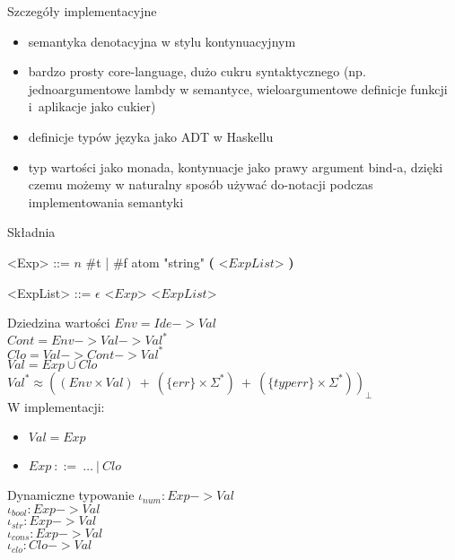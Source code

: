 \documentclass[12pt,serif]{beamer}
\begin{document}
\begin{frame}{Szczegóły implementacyjne}
\begin{itemize}
  \item semantyka denotacyjna w stylu kontynuacyjnym
  \item bardzo prosty core-language, dużo cukru syntaktycznego
        (np. jednoargumentowe lambdy w semantyce,
        wieloargumentowe definicje funkcji i~aplikacje jako cukier)
  \item definicje typów języka jako ADT w Haskellu
  \item typ wartości jako monada, kontynuacje jako prawy argument bind-a,
        dzięki czemu możemy w naturalny sposób używać do-notacji podczas
        implementowania semantyki
\end{itemize}
\end{frame}

\begin{frame}{Składnia}
\setlength{\grammarindent}{8em}
\begin{grammar}
<Exp> ::= $n$
\alt \#t | \#f
\alt atom
\alt "string"
\alt \textbf{(} <$ExpList$> \textbf{)}

<ExpList> ::= $\epsilon$
\alt <$Exp$> <$ExpList$>
\end{grammar}
\end{frame}

\begin{frame}{Dziedzina wartości}
$Env = Ide -> Val$ \\
$Cont = Env -> Val -> Val^{*}$ \\
$Clo = Val -> Cont -> Val^{*}$ \\
$Val = Exp \cup Clo$ \\
$Val^{*} \approx ((Env \times Val)~+~(\{err\} \times \Sigma^{*})~+~(\{typerr\} \times \Sigma^{*}))_{\bot}$\newline
\\
\pause
W implementacji:
\begin{itemize}
  \item $Val = Exp$
  \item $Exp~::=~\ldots~|~Clo$
\end{itemize}
\end{frame}


\begin{frame}{Dynamiczne typowanie}
$\iota_{num} : Exp -> Val$ \\
$\iota_{bool} : Exp -> Val$ \\
$\iota_{str} : Exp -> Val$ \\
$\iota_{cons} : Exp -> Val$ \\
$\iota_{clo} : Clo -> Val$ \\
\end{frame}
\end{document}
